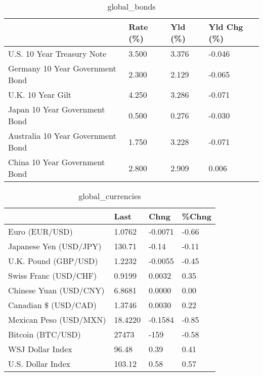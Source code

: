 \documentclass{article}%
\begin{document}
%


\begin{table}[htbp]%
\caption{global\_bonds}%
\centering%
\begin{adjustbox}{width=1\textwidth}%
\begin{tabular}{llll}
\toprule
                                  & Rate (\%) & Yld (\%) & Yld Chg (\%) \\
\midrule
       U.S. 10 Year Treasury Note &    3.500 &   3.376 &      -0.046 \\
  Germany 10 Year Government Bond &    2.300 &   2.129 &      -0.065 \\
                U.K. 10 Year Gilt &    4.250 &   3.286 &      -0.071 \\
    Japan 10 Year Government Bond &    0.500 &   0.276 &      -0.030 \\
Australia 10 Year Government Bond &    1.750 &   3.228 &      -0.071 \\
    China 10 Year Government Bond &    2.800 &   2.909 &       0.006 \\
\bottomrule
\end{tabular}
%
\end{adjustbox}%
\end{table}

%


\begin{table}[htbp]%
\caption{global\_currencies}%
\centering%
\begin{adjustbox}{width=1\textwidth}%
\begin{tabular}{llll}
\toprule
                       &    Last &    Chng & \%Chng \\
\midrule
        Euro (EUR/USD) &  1.0762 & -0.0071 & -0.66 \\
Japanese Yen (USD/JPY) &  130.71 &   -0.14 & -0.11 \\
  U.K. Pound (GBP/USD) &  1.2232 & -0.0055 & -0.45 \\
 Swiss Franc (USD/CHF) &  0.9199 &  0.0032 &  0.35 \\
Chinese Yuan (USD/CNY) &  6.8681 &  0.0000 &  0.00 \\
  Canadian \$ (USD/CAD) &  1.3746 &  0.0030 &  0.22 \\
Mexican Peso (USD/MXN) & 18.4220 & -0.1584 & -0.85 \\
     Bitcoin (BTC/USD) &   27473 &    -159 & -0.58 \\
      WSJ Dollar Index &   96.48 &    0.39 &  0.41 \\
     U.S. Dollar Index &  103.12 &    0.58 &  0.57 \\
\bottomrule
\end{tabular}
%
\end{adjustbox}%
\end{table}
\end{document}

